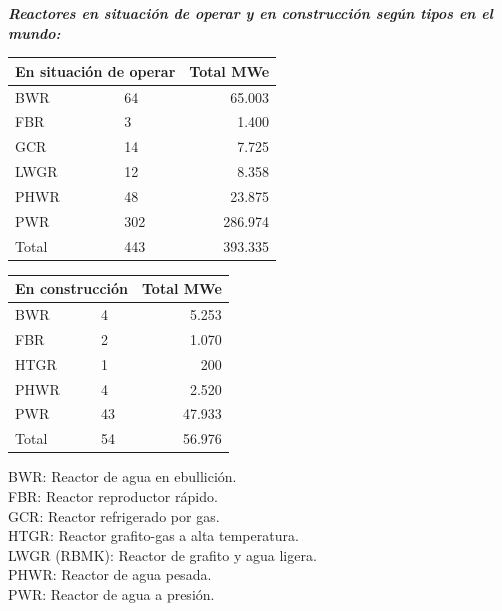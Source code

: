 				\newpage
				\textit{\textbf{Reactores en situación de operar y en construcción según tipos en el mundo:}}\\
				\begin{minipage}{0.5\textwidth}
					\centering
					\renewcommand{\arraystretch}{1.1}
					\begin{tabular}{llr}
						\hline
						\multicolumn{2}{c}{En situación de operar} & \multicolumn{1}{c}{Total MWe} \\ \hline
						BWR & 64 & 65.003 \\
						FBR & 3 & 1.400 \\
						GCR & 14 & 7.725 \\
						LWGR & 12 & 8.358 \\
						PHWR & 48 & 23.875 \\
						PWR & 302 & 286.974 \\
						\hline
						Total & 443 & 393.335 \\ 
						\hline
					\end{tabular}
				\end{minipage}
				\begin{minipage}{0.5\textwidth}
					\centering
					\renewcommand{\arraystretch}{1.1}
					\begin{tabular}{llr}
						\hline
						\multicolumn{2}{c}{En construcción} & \multicolumn{1}{c}{Total MWe} \\ 
						\hline
						BWR	&	4	&	5.253\\	
						FBR	&	2	&	1.070\\	
						HTGR&  	1  	&  	200\\	
						PHWR&   	4   	&   	  2.520\\	
						PWR&43&47.933\\ 
						\hline	
						Total & 54&56.976\\ 
						\hline	    					
					\end{tabular}
				\end{minipage}
				
				\begin{center}
					BWR: Reactor de agua en ebullición.\\
					\indent FBR: Reactor reproductor rápido.\\
					\indent GCR: Reactor refrigerado por gas.\\
					\indent HTGR: Reactor grafito-gas a alta temperatura.\\
					\indent LWGR (RBMK): Reactor de grafito y agua ligera.\\
					\indent PHWR: Reactor de agua pesada.\\
					\indent PWR: Reactor de agua a presión.\\
				\end{center}				
			
